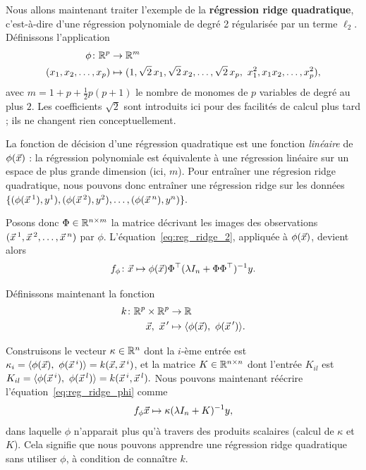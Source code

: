 Nous allons maintenant traiter l'exemple de la \textbf{régression ridge
  quadratique}, c'est-à-dire d'une régression polynomiale de degré 2
régularisée par un terme $\ell_2$. 
Définissons l'application
\begin{equation*}
  \begin{split}
    \phi\colon \mathbb{R}^p  & \to \mathbb{R}^m \\
    (x_1, x_2, \dots, x_p) & \mapsto (1, \sqrt{2}\,x_1, \sqrt{2}\, x_2, \dots,
    \sqrt{2}\, x_p,~x_1^2, x_1 x_2, \dots, x_p^2),
  \end{split}
\end{equation*}
avec $m = 1+ p + \frac12 p(p+1)$ le nombre de monomes de $p$ variables de degré
au plus $2$.  Les coefficients $\sqrt{2}$ sont introduits ici pour des
facilités de calcul plus tard ; ils ne changent rien conceptuellement.

La fonction de décision d'une régression quadratique est une fonction
\textit{linéaire} de $\phi(\xx)$ : la régression polynomiale est équivalente à
une régression linéaire sur un espace de plus grande dimension (ici, $m$).  
Pour entraîner une régresion ridge quadratique, nous pouvons donc entraîner une
régression ridge sur les données $\{(\phi(\xx^1), y^1), (\phi(\xx^2), y^2), \dots, (\phi(\xx^n), y^n)\}.$

Posons donc $\Phi \in \mathbb{R}^{n \times m}$ la matrice
décrivant les images des observations $(\xx^1, \xx^2, \dots, \xx^n)$ par $\phi$.
L'équation~\eqref{eq:reg_ridge_2}, appliquée à $\phi(\xx)$, devient alors
\begin{equation}
  \label{eq:reg_ridge_phi}
  f_\phi\colon \xx \mapsto \phi(\xx) \Phi^\top (\lambda I_n + \Phi \Phi^\top)^{-1} y.
\end{equation}

Définissons maintenant la fonction
\begin{equation}
  \label{eq:kernel}
  \begin{split}
    k \colon \RR^p \times \RR^p & \to \RR \\
    \xx,~\xx^\prime & \mapsto \innerproduct{\phi(\xx),~\phi(\xx^\prime)}.
  \end{split}
\end{equation}

Construisons le vecteur $\kappa \in \mathbb{R}^n$ dont la
$i$-ème entrée est
  $\kappa_i = \innerproduct{\phi(\xx),~\phi(\xx^i)} = k(\xx, \xx^i)$,
et la matrice $K \in \mathbb{R}^{n \times n}$ dont l'entrée $K_{il}$ est
$K_{il} = \innerproduct{\phi(\xx^i),~\phi(\xx^l)} = k(\xx^i, \xx^l).$
Nous pouvons maintenant réécrire l'équation~\eqref{eq:reg_ridge_phi} comme
\begin{equation}
  \label{eq:reg_ridge_k}
  f_\phi \xx \mapsto  \kappa (\lambda I_n + K)^{-1} y,
\end{equation}
dans laquelle $\phi$ n'apparait plus qu'à travers des produits scalaires (calcul de $\kappa$
et $K$).
Cela signifie que nous pouvons apprendre une régression ridge quadratique sans utiliser $\phi$, à condition de connaître $k$.

